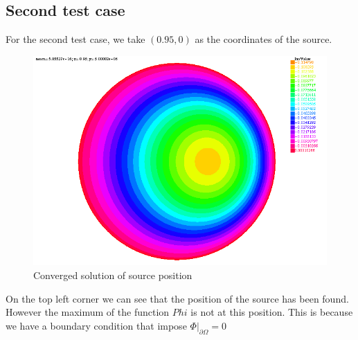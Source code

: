 \subsection{Second test case}

For the second test case, we take $(0.95,0)$ as the coordinates of the source.\\
\begin{figure}[H]
	\centering
	\includegraphics[scale=0.7]{0950.png}
	\caption{Converged solution of source position}
	\label{0950}
\end{figure}
On the top left corner we can see that the position of the source has been found. However the maximum of the function $Phi$ is not at this position. This is because we have a boundary condition that impose $\left.\Phi\right|_{\partial\Omega}=0$
 